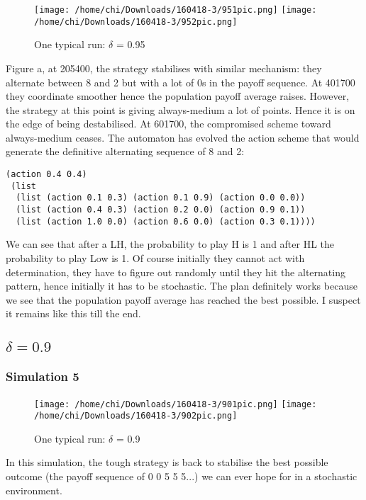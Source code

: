 \documentclass[12.5pt]{report}
\begin{document}
\begin{figure}
\texttt{[image: /home/chi/Downloads/160418-3/951pic.png]}
\texttt{[image: /home/chi/Downloads/160418-3/952pic.png]}

\caption{One typical run: $\delta$ = 0.95}
\end{figure}
Figure a, at 205400, the strategy stabilises with similar mechanism: they alternate between 8 and 2 but with a lot of 0s in the payoff sequence. At 401700 they coordinate smoother hence the population payoff average raises. However, the strategy at this point is giving always-medium a lot of points. Hence it is on the edge of being destabilised. At 601700, the compromised scheme toward always-medium ceases. The automaton has evolved the action scheme that would generate the definitive alternating sequence of 8 and 2:
\begin{verbatim}
(action 0.4 0.4)
 (list
  (list (action 0.1 0.3) (action 0.1 0.9) (action 0.0 0.0))
  (list (action 0.4 0.3) (action 0.2 0.0) (action 0.9 0.1))
  (list (action 1.0 0.0) (action 0.6 0.0) (action 0.3 0.1))))
\end{verbatim}

We can see that after a LH, the probability to play H is 1 and after HL the probability to play Low is 1.  Of course initially they cannot act with determination, they have to figure out randomly until they hit the alternating pattern, hence initially it has to be stochastic. The plan definitely works because we see that the population payoff average has reached the best possible. I suspect it remains like this till the end.\\


\subsection{$\delta = 0.9$}
\subsubsection{Simulation 5}


\begin{figure}
\texttt{[image: /home/chi/Downloads/160418-3/901pic.png]}
\texttt{[image: /home/chi/Downloads/160418-3/902pic.png]}

\caption{One typical run: $\delta$ = 0.9}
\end{figure}

In this simulation, the tough strategy is back to stabilise the best possible outcome (the payoff sequence of 0 0 5 5 5...) we can ever hope for in a stochastic environment.\\
\end{document}
